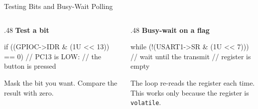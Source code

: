 \documentclass[9pt,aspectratio=169,xcolor=table]{beamer}
\begin{document}
\begin{frame}[fragile]{Testing Bits and Busy-Wait Polling}
    \begin{columns}[T]
    \begin{column}{.48\textwidth}
        \textbf{Test a bit}
\begin{cc}[basicstyle=\ttfamily\normalsize]
if ((GPIOC->IDR & (1U << 13)) == 0) {
    // PC13 is LOW:
    // the button is pressed
}
\end{cc}
\vspace{1em}
        {\small Mask the bit you want. Compare the result with zero.}
    \end{column}
    \begin{column}{.48\textwidth}
        \textbf{Busy-wait on a flag}
\begin{cc}[basicstyle=\ttfamily\normalsize]
while (!(USART1->SR & (1U << 7))) {
    // wait until the transmit
    // register is empty
}
\end{cc}
\vspace{1em}
        {\small The loop re-reads the register each time. This works only because the register is \texttt{volatile}.}
    \end{column}
    \end{columns}
\end{frame}
\end{document}

